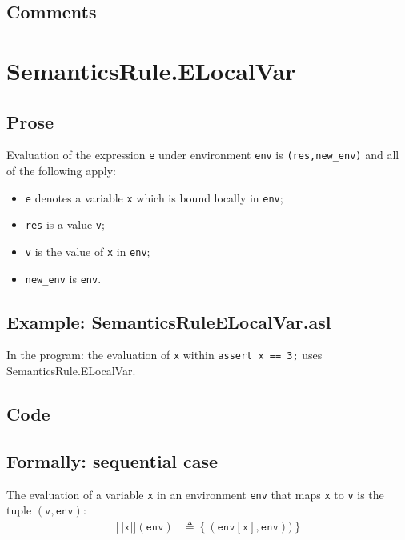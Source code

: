 \documentclass{book}
\newcommand\llbracket{[|}
\newcommand\rrbracket{|]}
\newcommand\interp[1]{\left\llbracket #1 \right\rrbracket}
\begin{document}
  \subsection{Comments}


\section{SemanticsRule.ELocalVar \label{sec:SemanticsRule.ELocalVar}}

  \subsection{Prose}
  Evaluation of the expression \texttt{e} under environment \texttt{env} is
  \texttt{(res,new\_env)} and all of the following apply:
  \begin{itemize}
  \item \texttt{e} denotes a variable \texttt{x} which is bound locally in \texttt{env};
  \item \texttt{res} is a value \texttt{v};
  \item \texttt{v} is the value of \texttt{x} in \texttt{env};
  \item \texttt{new\_env} is \texttt{env}.
  \end{itemize}

  \subsection{Example: SemanticsRuleELocalVar.asl}
    In the program:
    the evaluation of \texttt{x} within \texttt{assert x == 3;} uses SemanticsRule.ELocalVar.

  \subsection{Code}

  \subsection{Formally: sequential case}
  The evaluation of a variable \texttt{x} in an environment \texttt{env} that maps \texttt{x} to \texttt{v}
  is the tuple $(\texttt{v},\texttt{env})$: 
  \begin{align}
  \interp{\texttt{x}}(\texttt{env}) & \triangleq \left\{ (\texttt{env}[\texttt{x}], \texttt{env})) \right\}
  \label{eq:sem-seq-var}
  \end{align} 
 
\end{document}
